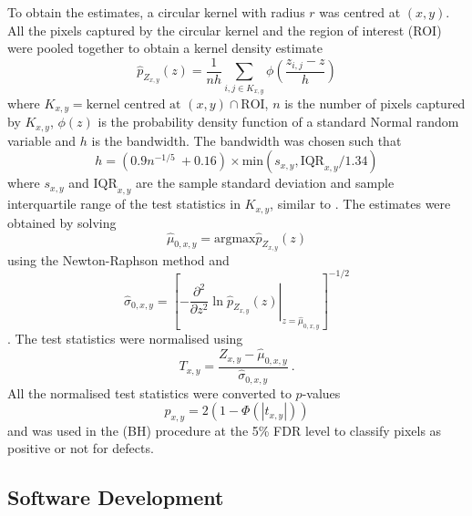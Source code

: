 \documentclass{proc}
\begin{document}
To obtain the estimates, a circular kernel with radius $r$ was centred at $(x,y)$. All the pixels captured by the circular kernel and the region of interest (ROI) were pooled together to obtain a kernel density estimate \citep{parzen1962on, friedman2001elements}
\begin{equation}
\widehat{p}_{Z_{x,y}}(z) = 
\frac{1}{nh}
  \sum_{i,j\in K_{x,y}}\phi\left(
    \dfrac{z_{i,j}-z}{h}
  \right)
\end{equation}
where $K_{x,y} = \text{kernel centred at }(x,y) \cap \text{ROI}$, $n$ is the number of pixels captured by $K_{x,y}$, $\phi(z)$ is the probability density function of a standard Normal random variable and $h$ is the bandwidth. The bandwidth was chosen such that
\begin{equation}
  h = (0.9n^{-1/5}\ + 0.16) \times \text{min}\left(s_{x,y},\text{IQR}_{x,y}/1.34\right)
  \label{eq:inference_ourruleofthumb}
\end{equation}
where $s_{x,y}$ and $\text{IQR}_{x,y}$ are the sample standard deviation and sample interquartile range of the test statistics in $K_{x,y}$, similar to \cite{silverman1986density, sheather2004density}. The estimates were obtained by solving
\begin{equation}
\widehat\mu_{0,x,y} = \text{argmax} \widehat{p}_{Z_{x,y}}(z)
\end{equation}
using the Newton-Raphson method and
\begin{equation}
  \widehat{\sigma}_{0,x,y} = \left[
    \left.
      -\dfrac{\partial^2}{\partial z^2}\ln\widehat{p}_{Z_{x,y}}(z)
    \right|_{z=\widehat{\mu}_{0,x,y}}
  \right]^{-1/2}
\end{equation}
\citep{efron2004large}. The test statistics were normalised using
\begin{equation}
  T_{x,y} = 
  \dfrac{
    Z_{x,y}-\widehat{\mu}_{0,x,y}
  }
  {
    \widehat{\sigma}_{0,x,y}
  } \ .
\end{equation}
All the normalised test statistics were converted to $p$-values
\begin{equation}
  p_{x,y} = 2(1-\Phi(|t_{x,y}|))
\end{equation}
and was used in the \cite{benjamini1995controlling} (BH) procedure at the 5\% FDR level to classify pixels as positive or not for defects.

\subsection{Software Development}
\end{document}
